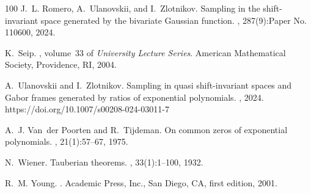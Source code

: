 \documentclass[12pt]{amsart}
\numberwithin{equation}{section}
\begin{document}
\begin{thebibliography}{100}
J.~L. Romero, A.~Ulanovskii, and I.~Zlotnikov.
\newblock Sampling in the shift-invariant space generated by the bivariate {G}aussian function.
, 287(9):Paper No. 110600, 2024.

K.~Seip.
, volume~33 of {\em University Lecture Series}.
\newblock American Mathematical Society, Providence, RI, 2004.

A.~Ulanovskii and I.~Zlotnikov.
\newblock Sampling in quasi shift-invariant spaces and {G}abor frames generated by ratios of exponential polynomials.
, 2024. https://doi.org/10.1007/s00208-024-03011-7

A.~J. Van~der Poorten and R.~Tijdeman.
\newblock On common zeros of exponential polynomials.
, 21(1):57--67, 1975.

N.~Wiener.
\newblock Tauberian theorems.
, 33(1):1--100, 1932.

R.~M. Young.
.
\newblock Academic Press, Inc., San Diego, CA, first edition, 2001.

\end{thebibliography}

 
\end{document}
